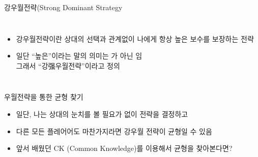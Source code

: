 \documentclass[final]{beamer}
\begin{document}
\begin{frame}[t]{강우월전략(Strong Dominant Strategy}
	\begin{columns}[c]
		\column{18em}
		\begin{itemize}
			\item 강우월전략이란 상대의 선택과 관계없이 나에게 항상 높은 보수를 보장하는 전략
			\item 일단 ``높은''이라는 말의 의미는 {\color{red}{$\geq$}}가 아닌 {\color{red}{$>$}}임 \\
		그래서 ``강强우월전략''이라고 정의
		\end{itemize}
		\column{13em}
	\end{columns}
\end{frame}

\begin{frame}[t]{우월전략을 통한 균형 찾기}
	\begin{itemize}
		\item 일단, 나는 상대의 눈치를 볼 필요가 없이 전략을 결정하고 
		\item 다른 모든 플레어어도 마찬가지라면 강우월 전략이 균형일 수 있음
		\item 앞서 배웠던 CK (Common Knowledge)를 이용해서 균형을 찾아본다면? 
	\end{itemize}
\end{frame}
\end{document}
